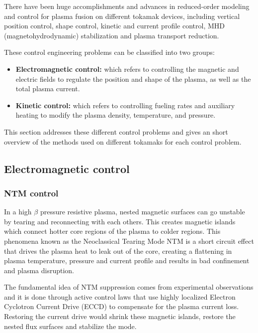 \documentclass[12pt,lot, lof]{puthesis}
\begin{document}
There have been huge accomplishments and advances in reduced-order modeling and control for plasma fusion on different tokamak devices, including vertical position control, shape control, kinetic and current profile control, MHD (magnetohydrodynamic) stabilization and plasma transport reduction.

These control engineering problems can be classified into two groups: 
\begin{itemize}
\item \textbf{Electromagnetic control:} which refers to controlling the magnetic and electric fields to regulate the position and shape of the plasma, as well as the total plasma current. 

\item \textbf{Kinetic control:} which refers to controlling fueling rates and auxiliary heating to modify the plasma density, temperature, and pressure.
\end{itemize}
This section addresses these different control problems and gives an short overview of the methods used on different tokamaks for each control problem.

\subsection{Electromagnetic control}

\subsubsection{NTM control}
In a high $\beta$ pressure resistive plasma, nested magnetic surfaces can go unstable by tearing and reconnecting with each others. This creates magnetic islands which connect hotter core regions of the plasma to colder regions. This phenomena known as the Neoclassical Tearing Mode NTM is a short circuit effect that drives the plasma heat to leak out of the core, creating a flattening in plasma temperature, pressure and current profile and results in bad confinement and plasma disruption.

The fundamental idea of NTM suppression comes from experimental observations and it is done through active control laws that use highly localized Electron Cyclotron Current Drive (ECCD) to compensate for the plasma current loss. Restoring the current drive would shrink these magnetic islands, restore the nested flux surfaces and stabilize the mode.
\end{document}
